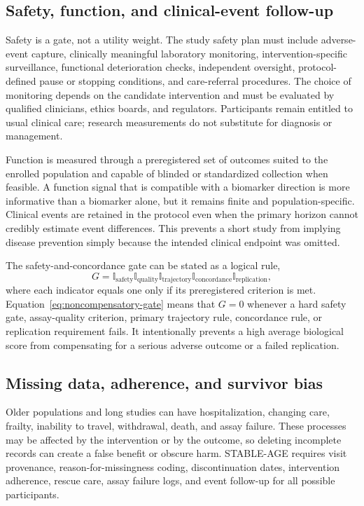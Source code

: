 \documentclass[10pt,conference]{IEEEtran}
\begin{document}
\subsection{Safety, function, and clinical-event follow-up}

Safety is a gate, not a utility weight. The study safety plan must include adverse-event capture, clinically meaningful laboratory monitoring, intervention-specific surveillance, functional deterioration checks, independent oversight, protocol-defined pause or stopping conditions, and care-referral procedures. The choice of monitoring depends on the candidate intervention and must be evaluated by qualified clinicians, ethics boards, and regulators. Participants remain entitled to usual clinical care; research measurements do not substitute for diagnosis or management.

Function is measured through a preregistered set of outcomes suited to the enrolled population and capable of blinded or standardized collection when feasible. A function signal that is compatible with a biomarker direction is more informative than a biomarker alone, but it remains finite and population-specific. Clinical events are retained in the protocol even when the primary horizon cannot credibly estimate event differences. This prevents a short study from implying disease prevention simply because the intended clinical endpoint was omitted.

The safety-and-concordance gate can be stated as a logical rule,
\begin{equation}
G=\mathbb{I}_{\mathrm{safety}}\mathbb{I}_{\mathrm{quality}}\mathbb{I}_{\mathrm{trajectory}}\mathbb{I}_{\mathrm{concordance}}\mathbb{I}_{\mathrm{replication}},
\label{eq:noncompensatory-gate}
\end{equation}
where each indicator equals one only if its preregistered criterion is met. Equation~\eqref{eq:noncompensatory-gate} means that $G=0$ whenever a hard safety gate, assay-quality criterion, primary trajectory rule, concordance rule, or replication requirement fails. It intentionally prevents a high average biological score from compensating for a serious adverse outcome or a failed replication.

\subsection{Missing data, adherence, and survivor bias}

Older populations and long studies can have hospitalization, changing care, frailty, inability to travel, withdrawal, death, and assay failure. These processes may be affected by the intervention or by the outcome, so deleting incomplete records can create a false benefit or obscure harm. STABLE-AGE requires visit provenance, reason-for-missingness coding, discontinuation dates, intervention adherence, rescue care, assay failure logs, and event follow-up for all possible participants.
\end{document}
